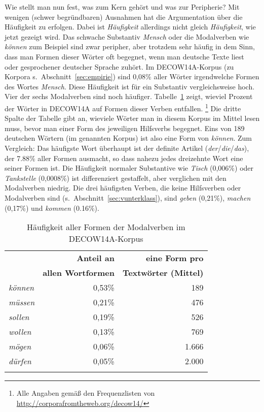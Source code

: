 Wie stellt man nun fest, was zum Kern gehört und was zur Peripherie?
Mit wenigen (schwer begründbaren) Ausnahmen hat die Argumentation über die Häufigkeit zu erfolgen.
Dabei ist \textit{Häufigkeit} allerdings nicht gleich \textit{Häufigkeit}, wie jetzt gezeigt wird.
Das schwache Substantiv \textit{Mensch} oder die Modalverben wie \textit{können} zum Beispiel sind zwar peripher, aber trotzdem sehr häufig in dem Sinn, dass man Formen dieser Wörter oft begegnet, wenn man deutsche Texte liest oder gesprochener deutscher Sprache zuhört.
Im DECOW14A-Korpus (zu Korpora s.\ Abschnitt~\ref{sec:empirie}) sind 0,08\% aller Wörter irgendwelche Formen des Wortes \textit{Mensch}.
Diese Häufigkeit ist für ein Substantiv vergleichsweise hoch. 
Vier der sechs Modalverben sind noch häufiger.
Tabelle~\ref{tab:modvfreq} zeigt, wieviel Prozent der Wörter in DECOW14A auf Formen dieser Verben entfallen.%
\footnote{Alle Angaben gemäß den Frequenzlisten von \url{http://corporafromtheweb.org/decow14/}}
Die dritte Spalte der Tabelle gibt an, wieviele Wörter man in diesem Korpus im Mittel lesen muss, bevor man einer Form des jeweiligen Hilfsverbs begegnet.
Eins von 189 deutschen Wörtern (im genannten Korpus) ist also eine Form von \textit{können}.
Zum Vergleich: Das häufigste Wort überhaupt ist der definite Artikel (\textit{der}\slash\textit{die}\slash\textit{das}), der 7.88\% aller Formen ausmacht, so dass nahezu jedes dreizehnte Wort eine seiner Formen ist.
Die Häufigkeit normaler Substantive wie \textit{Tisch} (0,006\%) oder \textit{Tankstelle} (0,0008\%) ist differenziert gestaffelt, aber verglichen mit den Modalverben niedrig.
Die drei häufigsten Verben, die keine Hilfsverben oder Modalverben sind (s.\ Abschnitt~\ref{sec:vunterklass}), sind \textit{geben} (0,21\%), \textit{machen} (0,17\%) und \textit{kommen} (0.16\%).

\begin{table}[!htbp]
  \begin{tabular}{lrr}
    \lsptoprule
    \multirow{2}{*}{\textbf{Modalverb}} & \textbf{Anteil an} & \textbf{eine Form pro}\\
    & \textbf{allen Wortformen} & \textbf{Textwörter (Mittel)}\\
    \midrule
    \textit{können} & 0,53\% &   189 \\
    \textit{müssen} & 0,21\% &   476 \\
    \textit{sollen} & 0,19\% &   526 \\
    \textit{wollen} & 0,13\% &   769 \\
    \textit{mögen}  & 0,06\% & 1.666\\
    \textit{dürfen} & 0,05\% & 2.000\\
    \lspbottomrule
  \end{tabular}
  \caption{Häufigkeit aller Formen der Modalverben im DECOW14A-Korpus}
  \label{tab:modvfreq}
\end{table}

